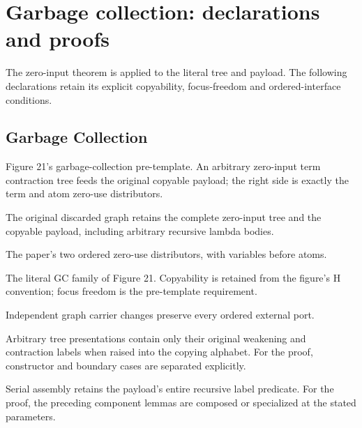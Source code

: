 \clearpage
\section{Garbage collection: declarations and proofs}
\label{sec:garbage-concordance}
The zero-input theorem is applied to the literal tree and payload. The following declarations retain its explicit copyability, focus-freedom and ordered-interface conditions.

\subsection{Garbage Collection}
Figure 21's garbage-collection pre-template. An arbitrary zero-input term contraction tree feeds the original copyable payload; the right side is exactly the term and atom zero-use distributors.

The original discarded graph retains the complete zero-input tree and the copyable payload, including arbitrary recursive lambda bodies.
\par{}

The paper's two ordered zero-use distributors, with variables before atoms.
\par{}

The literal GC family of Figure 21. Copyability is retained from the figure's H convention; focus freedom is the pre-template requirement.
\par{}

Independent graph carrier changes preserve every ordered external port.
\par{}

Arbitrary tree presentations contain only their original weakening and contraction labels when raised into the copying alphabet.
For the proof, constructor and boundary cases are separated explicitly.
\par{}

Serial assembly retains the payload's entire recursive label predicate.
For the proof, the preceding component lemmas are composed or specialized at the stated parameters.
\par{}

